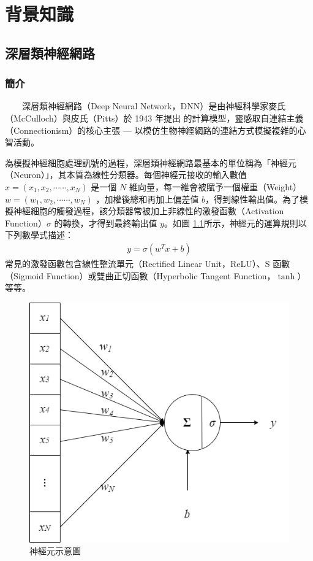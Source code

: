 
\chapter{背景知識}

\section{深層類神經網路}

\subsection{簡介}

　　深層類神經網路（Deep Neural Network，DNN）是由神經科學家麥氏（McCulloch）與皮氏（Pitts）於 1943 年提出 \cite{mcculloch_logical_1943} 的計算模型，靈感取自連結主義（Connectionism）的核心主張 --- 以模仿生物神經網路的連結方式模擬複雜的心智活動。

        為模擬神經細胞處理訊號的過程，深層類神經網路最基本的單位稱為「神經元（Neuron）」，其本質為線性分類器。每個神經元接收的輸入數值 $x = (x_1, x_2, \cdots\cdots, x_N)$ 是一個 $N$ 維向量，每一維會被賦予一個權重（Weight） $w = (w_1, w_2, \cdots\cdots, w_N)$  ，加權後總和再加上偏差值 $b$，得到線性輸出值。為了模擬神經細胞的觸發過程，該分類器常被加上非線性的激發函數（Activation Function）$\sigma$ 的轉換，才得到最終輸出值 $y$。如圖 \ref{fig:single-neuron}所示，神經元的運算規則以下列數學式描述：
\begin{align}
    y = \sigma(w^T x + b)
\end{align}
常見的激發函數包含線性整流單元（Rectified Linear Unit，ReLU）、S 函數（Sigmoid Function）或雙曲正切函數（Hyperbolic Tangent Function，$\tanh$）等等。

\begin{figure}
    \centering
    \includegraphics[width=0.5\linewidth]{figures/neuron.drawio.png}
    \caption{神經元示意圖}
    \label{fig:single-neuron}
\end{figure}

